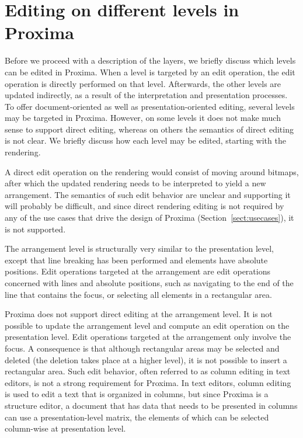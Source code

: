 \documentclass{speauth}
\begin{document}
%																
%																
%																
\section{Editing on different levels in Proxima}

Before we proceed with a description of the layers, we briefly discuss which levels can be edited in Proxima. When a level is targeted by an edit operation, the edit operation is directly performed on that level. Afterwards, the other levels are updated indirectly, as a result of the interpretation and presentation processes. To offer document-oriented as well as presentation-oriented editing, several levels may be targeted in Proxima. However, on some levels it does not make much sense to support direct editing, whereas on others the semantics of direct editing is not clear. We briefly discuss how each level may be edited, starting with the rendering.


A direct edit operation on the rendering would consist of moving around bitmaps, after which the updated rendering needs to be interpreted to yield a new arrangement. The semantics of such edit behavior are unclear and supporting it will probably be difficult, and since direct rendering editing is not required by any of the use cases that drive the design of Proxima (Section~\ref{sect:usecases}), it is not supported.
  
  
\bc
The arrangement level is structurally very similar to the presentation level, except that line breaking has been performed and elements have absolute positions. Edit operations targeted at the arrangement are edit operations concerned with lines and absolute positions, such as navigating to the end of the line that contains the focus, or selecting all elements in a rectangular area.
\ec
{}

Proxima does not support direct editing at the arrangement level. It is not possible to update the arrangement level and compute an edit operation on the presentation level. Edit operations targeted at the arrangement only involve the focus. A consequence is that although rectangular areas may be selected and deleted (the deletion takes place at a higher level), it is not possible to insert a rectangular area. Such edit behavior, often referred to as column editing in text editors, is not a strong requirement for Proxima. In text editors, column editing is used to edit a text that is organized in columns, but since Proxima is a structure editor, a document that has data that needs to be presented in columns can use a presentation-level matrix, the elements of which can be selected column-wise at presentation level.
\end{document}
